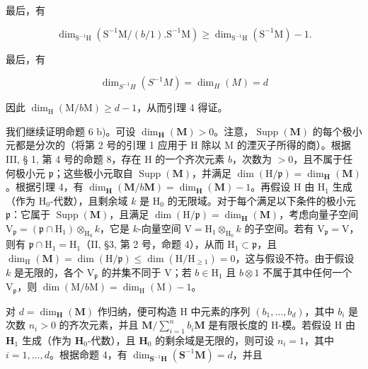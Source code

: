 最后，有

\[
\dim_ {\mathrm{S} ^ {- 1} \mathrm{H}} (\mathrm{S} ^ {- 1} \mathrm{M} / (b / 1). \mathrm{S} ^ {- 1} \mathrm{M}) \geqslant \dim_ {\mathrm{S} ^ {- 1} \mathrm{H}} (\mathrm{S} ^ {- 1} \mathrm{M}) - 1.
\]

最后，有

\[
\dim_ {S ^ {- 1} H} (S ^ {- 1} M) = \dim_ {H} (M) = d
\]

因此 \(\dim_{\mathrm{H}}(\mathrm{M}/b\mathrm{M}) \geqslant d - 1\)，从而引理 4 得证。

我们继续证明命题 6 b)。可设 \(\dim_{\mathbf{H}}(\mathbf{M}) > 0\)。注意，\(\operatorname{Supp}(\mathbf{M})\) 的每个极小元都是分次的（将第 2 号的引理 1 应用于 H 除以 M 的湮灭子所得的商）。根据 III, § 1, 第 4 号的命题 8，存在 H 的一个齐次元素 \(b\)，次数为 \(>0\)，且不属于任何极小元 \(\mathfrak{p}\)；这些极小元取自 \(\operatorname{Supp}(\mathbf{M})\)，并满足 \(\dim(\mathrm{H}/\mathfrak{p}) = \dim_{\mathbf{H}}(\mathbf{M})\)。根据引理 4，有 \(\dim_{\mathbf{H}}(\mathbf{M}/b\mathbf{M}) = \dim_{\mathbf{H}}(\mathbf{M}) - 1\)。再假设 H 由 \(\mathrm{H}_{1}\) 生成（作为 \(\mathrm{H}_{0}\)-代数），且剩余域 \(k\) 是 \(\mathrm{H}_{0}\) 的无限域。对于每个满足以下条件的极小元 \(\mathfrak{p}\)：它属于 \(\operatorname{Supp}(\mathbf{M})\)，且满足 \(\dim(\mathrm{H}/\mathfrak{p}) = \dim_{\mathbf{H}}(\mathbf{M})\)，考虑向量子空间 \(\mathrm{V}_{\mathfrak{p}} = (\mathfrak{p} \cap \mathrm{H}_{1}) \otimes_{\mathrm{H}_{0}} k\)，它是 \(k\)-向量空间 \(\mathrm{V} = \mathrm{H}_{1} \otimes_{\mathrm{H}_{0}} k\) 的子空间。若有 \(\mathrm{V}_{\mathfrak{p}} = \mathrm{V}\)，则有 \(\mathfrak{p} \cap \mathrm{H}_1 = \mathrm{H}_1\)（II, §3, 第 2 号，命题 4），从而 \(\mathrm{H}_1 \subset \mathfrak{p}\)，且 \(\dim_{\mathrm{H}}(\mathbf{M}) = \dim(\mathrm{H}/\mathfrak{p}) \leqslant \dim(\mathrm{H}/\mathrm{H}_{\geqslant 1}) = 0\)，这与假设不符。由于假设 \(k\) 是无限的，各个 \(\mathrm{V}_{\mathfrak{p}}\) 的并集不同于 V；若 \(b \in \mathrm{H}_1\) 且 \(b \otimes 1\) 不属于其中任何一个 \(\mathrm{V}_{\mathfrak{p}}\)，则 \(\dim(\mathrm{M}/b\mathrm{M}) = \dim_{\mathrm{H}}(\mathrm{M}) - 1\)。

对 \(d = \dim_{\mathbf{H}}(\mathbf{M})\) 作归纳，便可构造 H 中元素的序列 \((b_1, \ldots, b_d)\)，其中 \(b_i\) 是次数 \(n_i > 0\) 的齐次元素，并且 \(\mathbf{M} / \sum_{i=1}^{n} b_i \mathbf{M}\) 是有限长度的 H-模。若假设 H 由 \(\mathbf{H}_1\) 生成（作为 \(\mathbf{H}_0\)-代数），且 \(\mathbf{H}_0\) 的剩余域是无限的，则可设 \(n_i = 1\)，其中 \(i = 1, \ldots, d\)。根据命题 4，有 \(\dim_{\mathbf{S}^{-1}\mathbf{H}}(\mathbf{S}^{-1}\mathbf{M}) = d\)，并且

